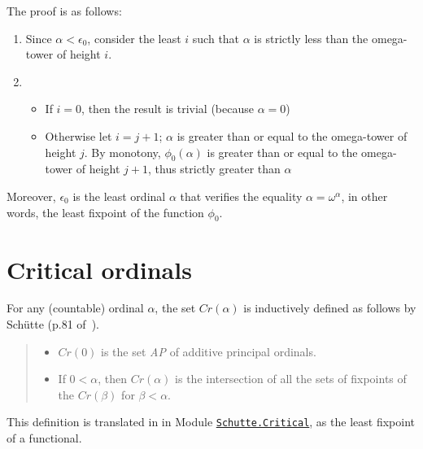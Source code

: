 


The proof is as follows:
\begin{enumerate}
\item Since $\alpha<\epsilon_0$, consider the least $i$ such that $\alpha$ is strictly less than the omega-tower of height $i$.
\item
  \begin{itemize}
  \item If $i=0$, then the result is trivial (because $\alpha=0$)
 \item  Otherwise let $i=j+1$; 
          $\alpha$ is greater than or equal to the omega-tower of height $j$.
         By monotony,  $\phi_0(\alpha)$ is greater than or equal to 
        the omega-tower of height $j+1$, thus strictly greater than $\alpha$
  \end{itemize}
 \end{enumerate}

Moreover,  $\epsilon_0$ is the least ordinal $\alpha$ that verifies the equality 
$\alpha = \omega^\alpha$, in other words, the least fixpoint of the function  $\phi_0$.



\section{Critical ordinals}


For any  (countable) ordinal $\alpha$, the set $\textit{Cr}(\alpha)$ is inductively defined 
as follows by Schütte (p.81 of~\cite{schutte}).

\begin{quote}
  \begin{itemize}
  \item $\textit{Cr}(0)$ is the set \textit{AP} of additive principal ordinals.
  \item If $0<\alpha$, then $\textit{Cr}(\alpha)$ is the intersection of all the sets of fixpoints of the $\textit{Cr}(\beta)$ for $\beta<\alpha$.
  \end{itemize}
\end{quote}

This definition is translated in \coq{} in 
Module \href{../theories/html/hydras.Schutte.Critical.html}%
{\texttt{Schutte.Critical}}, as the least fixpoint of a functional. 

